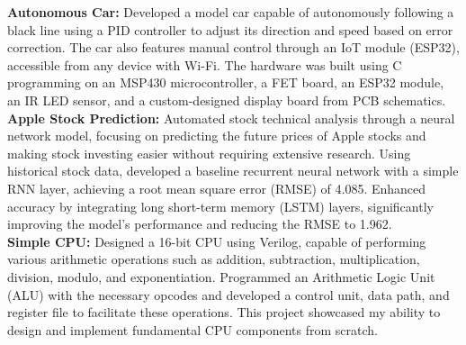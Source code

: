 \documentclass[letterpaper,9pt]{article}
\begin{document}
\noindent \textbf{Autonomous Car:} Developed a model car capable of autonomously following a black line using a PID controller to adjust its direction and speed based on error correction. The car also features manual control through an IoT module (ESP32), accessible from any device with Wi-Fi. The hardware was built using C programming on an MSP430 microcontroller, a FET board, an ESP32 module, an IR LED sensor, and a custom-designed display board from PCB schematics.\\

\noindent \textbf{Apple Stock Prediction:} Automated stock technical analysis through a neural network model, focusing on predicting the future prices of Apple stocks and making stock investing easier without requiring extensive research. Using historical stock data, developed a baseline recurrent neural network with a simple RNN layer, achieving a root mean square error (RMSE) of 4.085. Enhanced accuracy by integrating long short-term memory (LSTM) layers, significantly improving the model’s performance and reducing the RMSE to 1.962.\\

\noindent \textbf{Simple CPU:} Designed a 16-bit CPU using Verilog, capable of performing various arithmetic operations such as addition, subtraction, multiplication, division, modulo, and exponentiation. Programmed an Arithmetic Logic Unit (ALU) with the necessary opcodes and developed a control unit, data path, and register file to facilitate these operations. This project showcased my ability to design and implement fundamental CPU components from scratch.
\end{document}
